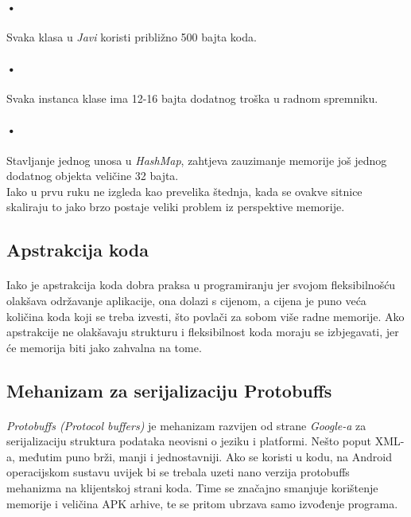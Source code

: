 \documentclass[times, utf8, zavrsni]{fer}
\begin{document}
\paragraph{•}
Svaka klasa u \textit{Javi} koristi približno 500 bajta koda.

\paragraph{•}
Svaka instanca klase ima 12-16 bajta dodatnog troška u radnom spremniku.

\paragraph{•}
Stavljanje jednog unosa u \textit{HashMap}, zahtjeva zauzimanje memorije još jednog dodatnog objekta veličine 32 bajta.\\

Iako u prvu ruku ne izgleda kao prevelika štednja, kada se ovakve sitnice  skaliraju to jako brzo postaje veliki problem iz perspektive memorije.

\subsection{Apstrakcija koda}
\paragraph{}
Iako je apstrakcija koda dobra praksa u programiranju jer svojom fleksibilnošću olakšava održavanje aplikacije, ona dolazi s cijenom, a cijena je puno veća količina koda koji se treba izvesti, što povlači za sobom više radne memorije. Ako apstrakcije ne olakšavaju strukturu i fleksibilnost koda moraju se izbjegavati, jer će memorija biti jako zahvalna na tome.

\subsection{Mehanizam za serijalizaciju Protobuffs}
\paragraph{}
\textit{Protobuffs (Protocol buffers)} je mehanizam razvijen od strane \textit{Google-a} za serijalizaciju struktura podataka neovisni o jeziku i platformi. Nešto poput XML-a, međutim puno brži, manji i jednostavniji. Ako se koristi u kodu, na Android operacijskom sustavu uvijek bi se trebala uzeti nano verzija protobuffs mehanizma na klijentskoj strani koda. Time se značajno smanjuje korištenje memorije i veličina APK arhive, te se pritom ubrzava samo izvođenje programa.
\end{document}
